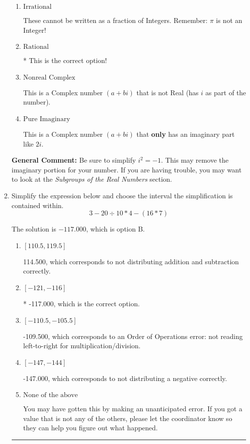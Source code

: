 \documentclass{extbook}[14pt]
\newcommand{\litem}[1]{\item #1

\rule{\textwidth}{0.4pt}}
\begin{document}
\begin{enumerate}
{\begin{enumerate}[label=\Alph*.]
This is not a number. The only non-Complex number we know is dividing by 0 as this is not a number!
\item \( \text{Irrational} \)

These cannot be written as a fraction of Integers. Remember: $\pi$ is not an Integer!
\item \( \text{Rational} \)

* This is the correct option!
\item \( \text{Nonreal Complex} \)

This is a Complex number $(a+bi)$ that is not Real (has $i$ as part of the number).
\item \( \text{Pure Imaginary} \)

This is a Complex number $(a+bi)$ that \textbf{only} has an imaginary part like $2i$.
\end{enumerate}

\textbf{General Comment:} Be sure to simplify $i^2 = -1$. This may remove the imaginary portion for your number. If you are having trouble, you may want to look at the \textit{Subgroups of the Real Numbers} section.
}
\litem{
Simplify the expression below and choose the interval the simplification is contained within.
\[ 3 - 20 \div 10 * 4 - (16 * 7) \]

The solution is \( -117.000 \), which is option B.\begin{enumerate}[label=\Alph*.]
\item \( [110.5, 119.5] \)

 114.500, which corresponds to not distributing addition and subtraction correctly.
\item \( [-121, -116] \)

* -117.000, which is the correct option.
\item \( [-110.5, -105.5] \)

 -109.500, which corresponds to an Order of Operations error: not reading left-to-right for multiplication/division.
\item \( [-147, -144] \)

 -147.000, which corresponds to not distributing a negative correctly.
\item \( \text{None of the above} \)

 You may have gotten this by making an unanticipated error. If you got a value that is not any of the others, please let the coordinator know so they can help you figure out what happened.
\end{enumerate}

}
\end{enumerate}
\end{document}
